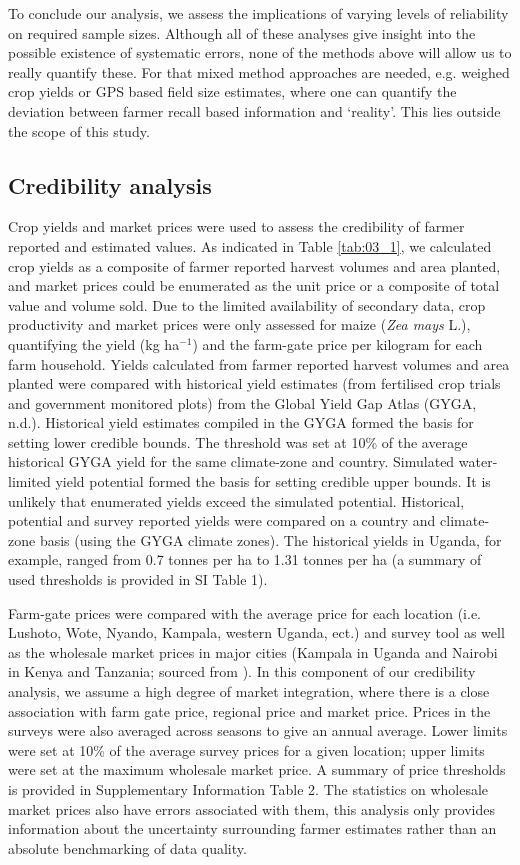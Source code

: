 To conclude our analysis, we assess the implications of varying levels of reliability on required sample sizes. Although all of these analyses give insight into the possible existence of systematic errors, none of the methods above will allow us to really quantify these. For that mixed method approaches are needed, e.g. weighed crop yields or GPS based field size estimates, where one can quantify the deviation between farmer recall based information and `reality'. This lies outside the scope of this study.

\subsection{Credibility analysis}

Crop yields and market prices were used to assess the credibility of farmer reported and estimated values. As indicated in Table \ref{tab:03_1}, we calculated crop yields as a composite of farmer reported harvest volumes and area planted, and market prices could be enumerated as the unit price or a composite of total value and volume sold. Due to the limited availability of secondary data, crop productivity and market prices were only assessed for maize (\textit{Zea mays} L.), quantifying the yield (kg ha$^{-1}$) and the farm-gate price per kilogram for each farm household. Yields calculated from farmer reported harvest volumes and area planted were compared with historical yield estimates (from fertilised crop trials and government monitored plots) from the Global Yield Gap Atlas (GYGA, n.d.). Historical yield estimates compiled in the GYGA formed the basis for setting lower credible bounds. The threshold was set at 10\% of the average historical GYGA yield for the same climate-zone and country. Simulated water-limited yield potential formed the basis for setting credible upper bounds. It is unlikely that enumerated yields exceed the simulated potential. Historical, potential and survey reported yields were compared on a country and climate-zone basis (using the GYGA climate zones). The historical yields in Uganda, for example, ranged from 0.7 tonnes per ha to 1.31 tonnes per ha (a summary of used thresholds is provided in SI Table 1).

Farm-gate prices were compared with the average price for each location (i.e. Lushoto, Wote, Nyando, Kampala, western Uganda, ect.) and survey tool as well as the wholesale market prices in major cities (Kampala in Uganda and Nairobi in Kenya and Tanzania; sourced from \citealp{FoodandAgricuturalOrganization2017}). In this component of our credibility analysis, we assume a high degree of market integration, where there is a close association with farm gate price, regional price and market price. Prices in the surveys were also averaged across seasons to give an annual average. Lower limits were set at 10\% of the average survey prices for a given location; upper limits were set at the maximum wholesale market price. A summary of price thresholds is provided in Supplementary Information Table 2. The statistics on wholesale market prices also have errors associated with them, this analysis only provides information about the uncertainty surrounding farmer estimates rather than an absolute benchmarking of data quality.


